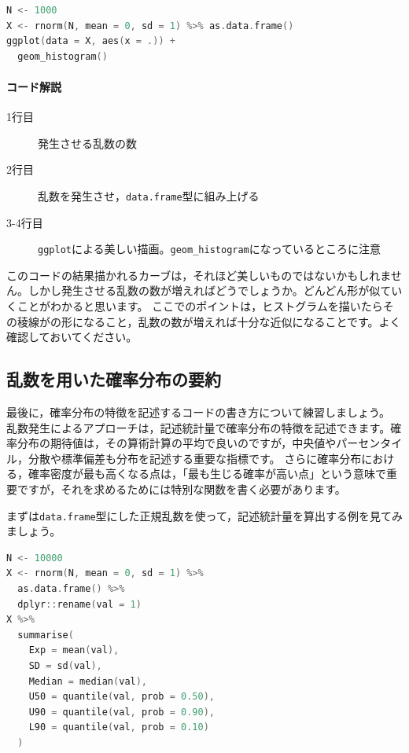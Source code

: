 \documentclass{ltjsbook}
\begin{document}
\begin{lstlisting}[language=c++,label={code:17_05},caption={確率分布の可視化2}]
N <- 1000
X <- rnorm(N, mean = 0, sd = 1) %>% as.data.frame()
ggplot(data = X, aes(x = .)) +
  geom_histogram()
\end{lstlisting}
\paragraph{コード解説}
\begin{description}
  \item[1行目] 発生させる乱数の数
  \item[2行目] 乱数を発生させ，\texttt{data.frame}型に組み上げる
  \item[3-4行目] \texttt{ggplot}による美しい描画。\verb|geom_histogram|になっているところに注意
\end{description}
このコードの結果描かれるカーブは，それほど美しいものではないかもしれません。しかし発生させる乱数の数が増えればどうでしょうか。どんどん形が似ていくことがわかると思います。
ここでのポイントは，ヒストグラムを描いたらその稜線がの形になること，乱数の数が増えれば十分な近似になることです。よく確認しておいてください。

\subsection{乱数を用いた確率分布の要約}
最後に，確率分布の特徴を記述するコードの書き方について練習しましょう。
乱数発生によるアプローチは，記述統計量で確率分布の特徴を記述できます。確率分布の期待値は，その算術計算の平均で良いのですが，中央値やパーセンタイル，分散や標準偏差も分布を記述する重要な指標です。
さらに確率分布における，確率密度が最も高くなる点は，「最も生じる確率が高い点」という意味で重要ですが，それを求めるためには特別な関数を書く必要があります。

まずは\texttt{data.frame}型にした正規乱数を使って，記述統計量を算出する例を見てみましょう。

\begin{lstlisting}[language=c++,label={code:17_06},caption={確率分布の要約}]
N <- 10000
X <- rnorm(N, mean = 0, sd = 1) %>%
  as.data.frame() %>%
  dplyr::rename(val = 1)
X %>%
  summarise(
    Exp = mean(val),
    SD = sd(val),
    Median = median(val),
    U50 = quantile(val, prob = 0.50),
    U90 = quantile(val, prob = 0.90),
    L90 = quantile(val, prob = 0.10)
  )
\end{lstlisting}
\end{document}
